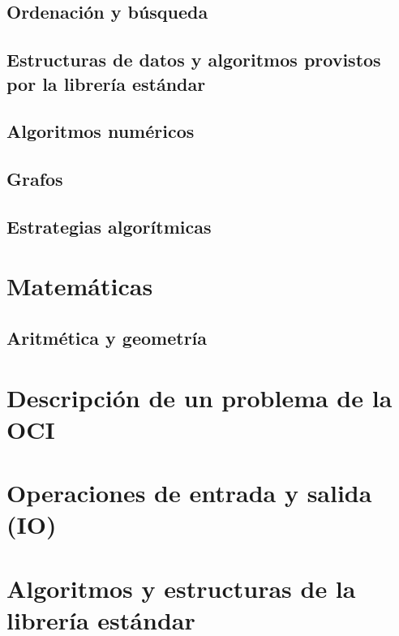 \documentclass{article}
\begin{document}
\subsection{Ordenación y búsqueda}


\subsection{Estructuras de datos y algoritmos provistos por la librería estándar}


\subsection{Algoritmos numéricos}


\subsection{Grafos}


\subsection{Estrategias algorítmicas}


\section{Matemáticas}
\subsection{Aritmética y geometría}



\newpage
\appendix
\section{Descripción de un problema de la OCI}
\label{problem-description}


\section{Operaciones de entrada y salida (IO)}
\label{tech-IO}


\section{Algoritmos y estructuras de la librería estándar}

\end{document}
